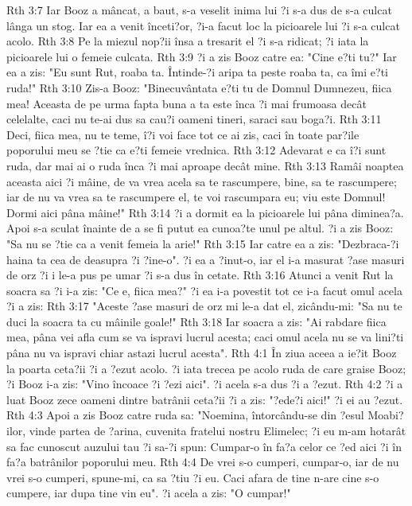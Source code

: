 Rth 3:7  Iar Booz a mâncat, a baut, s-a veselit inima lui ?i s-a dus de s-a culcat lânga un stog. Iar ea a venit înceti?or, ?i-a facut loc la picioarele lui ?i s-a culcat acolo.
Rth 3:8  Pe la miezul nop?ii însa a tresarit el ?i s-a ridicat; ?i iata la picioarele lui o femeie culcata.
Rth 3:9  ?i a zis Booz catre ea: "Cine e?ti tu?" Iar ea a zis: "Eu sunt Rut, roaba ta. Întinde-?i aripa ta peste roaba ta, ca îmi e?ti ruda!"
Rth 3:10  Zis-a Booz: "Binecuvântata e?ti tu de Domnul Dumnezeu, fiica mea! Aceasta de pe urma fapta buna a ta este înca ?i mai frumoasa decât celelalte, caci nu te-ai dus sa cau?i oameni tineri, saraci sau boga?i.
Rth 3:11  Deci, fiica mea, nu te teme, î?i voi face tot ce ai zis, caci în toate par?ile poporului meu se ?tie ca e?ti femeie vrednica.
Rth 3:12  Adevarat e ca î?i sunt ruda, dar mai ai o ruda înca ?i mai aproape decât mine.
Rth 3:13  Ramâi noaptea aceasta aici ?i mâine, de va vrea acela sa te rascumpere, bine, sa te rascumpere; iar de nu va vrea sa te rascumpere el, te voi rascumpara eu; viu este Domnul! Dormi aici pâna mâine!"
Rth 3:14  ?i a dormit ea la picioarele lui pâna diminea?a. Apoi s-a sculat înainte de a se fi putut ea cunoa?te unul pe altul. ?i a zis Booz: "Sa nu se ?tie ca a venit femeia la arie!"
Rth 3:15  Iar catre ea a zis: "Dezbraca-?i haina ta cea de deasupra ?i ?ine-o". ?i ea a ?inut-o, iar el i-a masurat ?ase masuri de orz ?i i le-a pus pe umar ?i s-a dus în cetate.
Rth 3:16  Atunci a venit Rut la soacra sa ?i i-a zis: "Ce e, fiica mea?" ?i ea i-a povestit tot ce i-a facut omul acela ?i a zis:
Rth 3:17  "Aceste ?ase masuri de orz mi le-a dat el, zicându-mi: "Sa nu te duci la soacra ta cu mâinile goale!"
Rth 3:18  Iar soacra a zis: "Ai rabdare fiica mea, pâna vei afla cum se va ispravi lucrul acesta; caci omul acela nu se va lini?ti pâna nu va ispravi chiar astazi lucrul acesta".
Rth 4:1  În ziua aceea a ie?it Booz la poarta ceta?ii ?i a ?ezut acolo. ?i iata trecea pe acolo ruda de care graise Booz; ?i Booz i-a zis: "Vino încoace ?i ?ezi aici". ?i acela s-a dus ?i a ?ezut.
Rth 4:2  ?i a luat Booz zece oameni dintre batrânii ceta?ii ?i a zis: "?ede?i aici!" ?i ei au ?ezut.
Rth 4:3  Apoi a zis Booz catre ruda sa: "Noemina, întorcându-se din ?esul Moabi?ilor, vinde partea de ?arina, cuvenita fratelui nostru Elimelec; ?i eu m-am hotarât sa fac cunoscut auzului tau ?i sa-?i spun: Cumpar-o în fa?a celor ce ?ed aici ?i în fa?a batrânilor poporului meu.
Rth 4:4  De vrei s-o cumperi, cumpar-o, iar de nu vrei s-o cumperi, spune-mi, ca sa ?tiu ?i eu. Caci afara de tine n-are cine s-o cumpere, iar dupa tine vin eu". ?i acela a zis: "O cumpar!"
